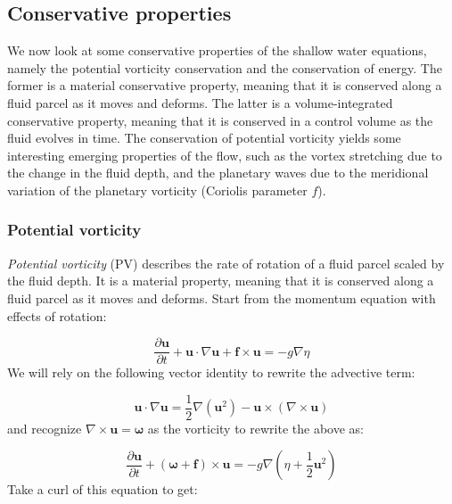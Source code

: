 \documentclass[12pt]{article}
\numberwithin{equation}{section}
\numberwithin{figure}{section}
\numberwithin{table}{section}
\begin{document}
\subsection{Conservative properties}

We now look at some conservative properties of the shallow water equations,
namely the potential vorticity conservation and the conservation of energy.
The former is a material conservative property, meaning that it is conserved
along a fluid parcel as it moves and deforms.
The latter is a volume-integrated conservative property, meaning that it is
conserved in a control volume as the fluid evolves in time.
The conservation of potential vorticity yields some interesting emerging
properties of the flow, such as the vortex stretching due to the change in the
fluid depth, and the planetary waves due to the meridional variation of the
planetary vorticity (Coriolis parameter $f$).

\subsubsection{Potential vorticity}

\textit{Potential vorticity} (PV) describes the rate
of rotation of a fluid parcel scaled by the fluid depth.
It is a material property, meaning that it is conserved along a fluid parcel
as it moves and deforms.
Start from the momentum equation with effects of rotation:

\begin{equation}
  \frac{\partial \mathbf{u}}{\partial t} +
  \mathbf{u} \cdot \nabla \mathbf{u} +
  \mathbf{f} \times \mathbf{u} =
  - g \nabla \eta
\end{equation}
We will rely on the following vector identity to rewrite the advective term:

\begin{equation}
  \mathbf{u} \cdot \nabla \mathbf{u} =
  \frac{1}{2} \nabla (\mathbf{u}^2) -
  \mathbf{u} \times (\nabla \times \mathbf{u})
\end{equation}
and recognize $\nabla \times \mathbf{u} = \boldsymbol{\omega}$ as the vorticity
to rewrite the above as:

\begin{equation}
  \frac{\partial \mathbf{u}}{\partial t} +
  \left(\boldsymbol{\omega} + \mathbf{f}\right) \times \mathbf{u} =
  - g \nabla \left(\eta + \frac{1}{2} \mathbf{u}^2 \right)
\end{equation}
Take a curl of this equation to get:
\end{document}

